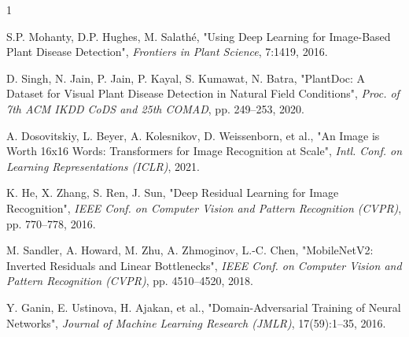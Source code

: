 \documentclass[twoside,a4paper,11pt]{article}
\begin{document}
\begin{thebibliography}{1}

S.P. Mohanty, D.P. Hughes, M. Salath\'e, "Using Deep Learning for Image-Based Plant Disease Detection", {\em Frontiers in Plant Science}, 7:1419, 2016.

D. Singh, N. Jain, P. Jain, P. Kayal, S. Kumawat, N. Batra, "PlantDoc: A Dataset for Visual Plant Disease Detection in Natural Field Conditions", {\em Proc. of 7th ACM IKDD CoDS and 25th COMAD}, pp. 249--253, 2020.

A. Dosovitskiy, L. Beyer, A. Kolesnikov, D. Weissenborn, et al., "An Image is Worth 16x16 Words: Transformers for Image Recognition at Scale", {\em Intl. Conf. on Learning Representations (ICLR)}, 2021.

K. He, X. Zhang, S. Ren, J. Sun, "Deep Residual Learning for Image Recognition", {\em IEEE Conf. on Computer Vision and Pattern Recognition (CVPR)}, pp. 770--778, 2016.

M. Sandler, A. Howard, M. Zhu, A. Zhmoginov, L.-C. Chen, "MobileNetV2: Inverted Residuals and Linear Bottlenecks", {\em IEEE Conf. on Computer Vision and Pattern Recognition (CVPR)}, pp. 4510--4520, 2018.

Y. Ganin, E. Ustinova, H. Ajakan, et al., "Domain-Adversarial Training of Neural Networks", {\em Journal of Machine Learning Research (JMLR)}, 17(59):1--35, 2016.

\end{thebibliography}
\end{document}

